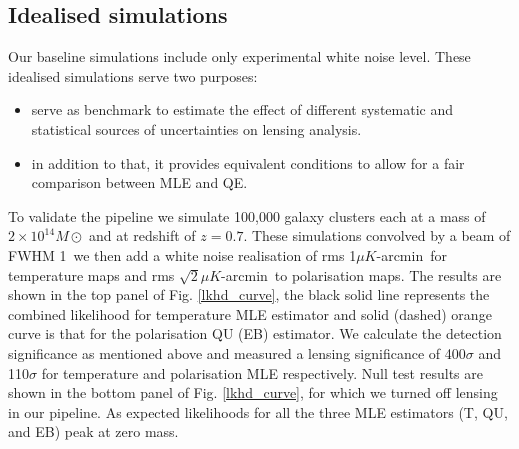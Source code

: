  \subsection{Idealised simulations}
 \label{sec_ideal_sims}
 Our baseline simulations include only experimental white noise level.
 These idealised simulations serve two purposes: 
 \begin{itemize}
 \item serve as benchmark to estimate the effect of different systematic and statistical sources of uncertainties on lensing analysis. 
 \item in addition to that, it provides equivalent conditions to allow for a fair comparison between MLE and QE.
\end{itemize}
 To validate the pipeline we simulate 100,000 galaxy clusters each at a mass of $2 \times10^{14} M{\odot}$ and at redshift of $z = 0.7$.
 These simulations convolved by a beam of FWHM 1\am\, we then add a white noise realisation of rms 1$\mu K$-arcmin\ for temperature maps and  rms $\sqrt{2}$$\mu K$-arcmin\ to polarisation maps. 
 The results are shown in the top panel of Fig. \ref{lkhd_curve}, the black solid line represents the combined likelihood for temperature MLE estimator and solid (dashed) orange curve is that for the polarisation QU (EB) estimator.%
 We calculate the detection significance as mentioned above and measured a lensing significance of 400$\sigma$ and 110$\sigma$ for temperature and polarisation MLE respectively. 
 Null test results are shown in the bottom panel of Fig. \ref{lkhd_curve}, for which we turned off lensing in our pipeline.
 As expected likelihoods for all the three MLE estimators (T, QU, and EB) peak at zero mass.
 
